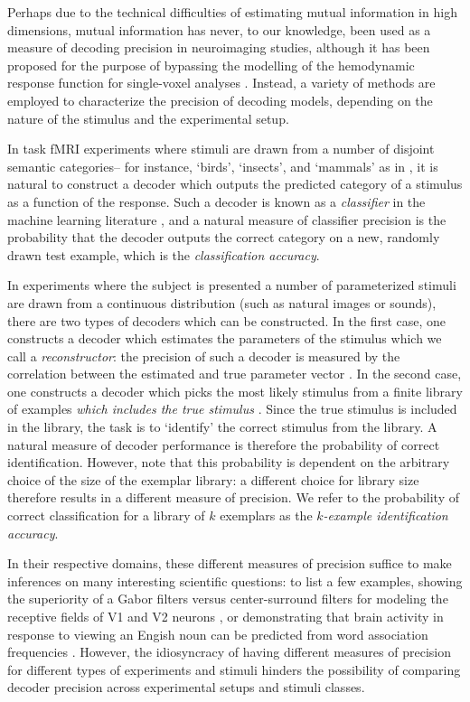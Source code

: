 \documentclass[12pt]{article}
\begin{document}
Perhaps due to the technical difficulties of estimating mutual
information in high dimensions, mutual information has never, to our
knowledge, been used as a measure of decoding precision in
neuroimaging studies, although it has been proposed for the purpose of
bypassing the modelling of the hemodynamic response function for
single-voxel analyses \cite{FuhrmannAlpert2007}.  Instead, a variety
of methods are employed to characterize the precision of decoding
models, depending on the nature of the stimulus and the experimental
setup.

In task fMRI experiments where stimuli are drawn from a number of
disjoint semantic categories-- for instance, `birds', `insects', and
`mammals' as in \cite{Connolly2012}, it is natural to construct a
decoder which outputs the predicted category of a stimulus as a
function of the response.  Such a decoder is known as
a \emph{classifier} in the machine learning
literature \cite{Hastie2009a}, and a natural measure of classifier
precision is the probability that the decoder outputs the correct
category on a new, randomly drawn test example, which is
the \emph{classification accuracy}.

In experiments where the subject is presented a number of
parameterized stimuli are drawn from a continuous distribution (such
as natural images or sounds), there are two types of decoders which
can be constructed.  In the first case, one constructs a decoder which
estimates the parameters of the stimulus which we call
a \emph{reconstructor}: the precision of such a decoder is measured by
the correlation between the estimated and true parameter vector
\cite{Pasley2012} \cite{Nishimoto2011}\cite{Naselaris2009}.
In the second case, one constructs a decoder which picks the most
likely stimulus from a finite library of examples \emph{which includes
the true stimulus} \cite{Kay2008a}\cite{Mitchell2008}.  Since the true
stimulus is included in the library, the task is to `identify' the
correct stimulus from the library.  A natural measure of decoder
performance is therefore the probability of correct identification.
However, note that this probability is dependent on the arbitrary
choice of the size of the exemplar library: a different choice for
library size therefore results in a different measure of precision.
We refer to the probability of correct classification for a library of
$k$ exemplars as the \emph{$k$-example identification accuracy}.

In their respective domains, these different measures of precision
suffice to make inferences on many interesting scientific questions:
to list a few examples, showing the superiority of a Gabor filters
versus center-surround filters for modeling the receptive fields of V1
and V2 neurons \cite{Kay2008a}, or demonstrating that brain activity
in response to viewing an Engish noun can be predicted from word
association frequencies \cite{Mitchell2008}.  However, the
idiosyncracy of having different measures of precision for different
types of experiments and stimuli hinders the possibility of comparing
decoder precision across experimental setups and stimuli classes.









{}

\end{document}
